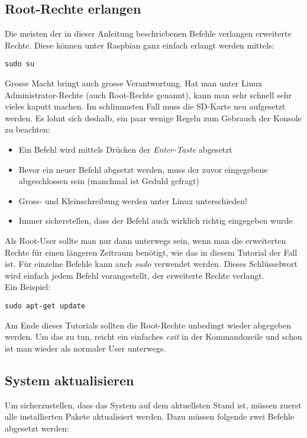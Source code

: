 \subsection{Root-Rechte erlangen}
Die meisten der in dieser Anleitung beschriebenen Befehle verlangen erweiterte Rechte. Diese können unter Raspbian ganz einfach erlangt werden mittels:

\begin{lstlisting}
sudo su
\end{lstlisting}

Grosse Macht bringt auch grosse Verantwortung. Hat man unter Linux Administrator-Rechte (auch Root-Rechte genannt), kann man sehr schnell sehr vieles kaputt machen. Im schlimmsten Fall muss die SD-Karte neu aufgesetzt werden. Es lohnt sich deshalb, ein paar wenige Regeln zum Gebrauch der Konsole zu beachten:

\begin{itemize}
  \item Ein Befehl wird mittels Drücken der \textit{Enter-Taste} abgesetzt
\item Bevor ein neuer Befehl abgsetzt werden, muss der zuvor eingegebene abgeschlossen sein (manchmal ist Geduld gefragt)
\item Gross- und Kleinschreibung werden unter Linux unterschieden!
\item Immer sicherstellen, dass der Befehl auch wirklich richtig eingegeben wurde
\end{itemize}

Als Root-User sollte man nur dann unterwegs sein, wenn man die erweiterten Rechte für einen längeren Zeitraum benötigt, wie das in diesem Tutorial der Fall ist. Für einzelne Befehle kann auch \textit{sudo} verwendet werden. Dieses Schlüsselwort wird einfach jedem Befehl vorangestellt, der erweiterte Rechte verlangt.
\\
Ein Beispiel:

\begin{lstlisting}
sudo apt-get update
\end{lstlisting}

Am Ende dieses Tutorials sollten die Root-Rechte unbedingt wieder abgegeben werden. Um das zu tun, reicht ein einfaches \textit{exit} in der Kommandozeile und schon ist man wieder als normaler User unterwegs.

\subsection{System aktualisieren}
Um sicherzustellen, dass das System auf dem aktuellsten Stand ist, müssen zuerst alle installierten Pakete aktualisiert werden. Dazu müssen folgende zwei Befehle abgesetzt werden:

